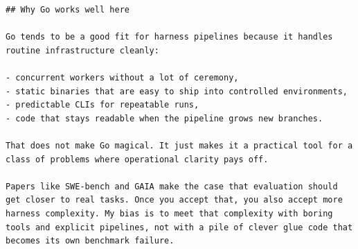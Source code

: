 \documentclass[aspectratio=169]{beamer}
\begin{document}
\begin{frame}[fragile]
\begin{verbatim}
## Why Go works well here

Go tends to be a good fit for harness pipelines because it handles routine infrastructure cleanly:

- concurrent workers without a lot of ceremony,
- static binaries that are easy to ship into controlled environments,
- predictable CLIs for repeatable runs,
- code that stays readable when the pipeline grows new branches.

That does not make Go magical. It just makes it a practical tool for a class of problems where operational clarity pays off.

Papers like SWE-bench and GAIA make the case that evaluation should get closer to real tasks. Once you accept that, you also accept more harness complexity. My bias is to meet that complexity with boring tools and explicit pipelines, not with a pile of clever glue code that becomes its own benchmark failure.
\end{verbatim}
\end{frame}
\end{document}
